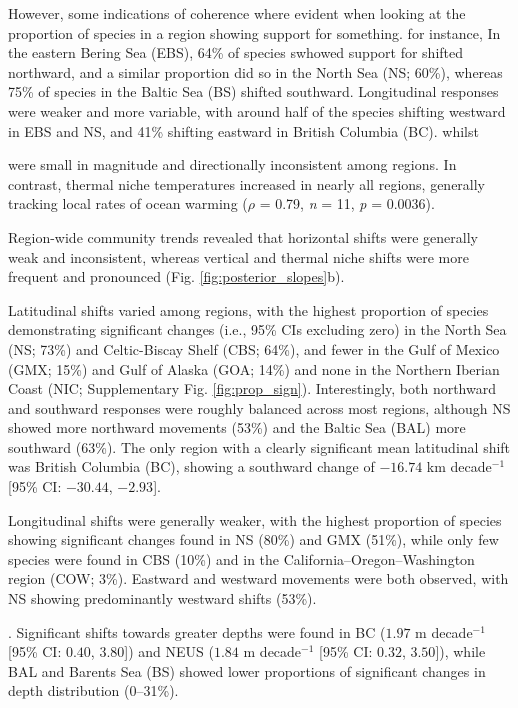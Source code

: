 \documentclass[lineno,pdflatex,sn-nature]{sn-jnl}%
\begin{document}
However, some indications of coherence where evident when looking at the proportion of species in a region showing support for something. for instance, In the eastern Bering Sea (EBS), 64\% of species swhowed support for shifted northward, and a similar proportion did so in the North Sea (NS; 60\%), whereas 75\% of species in the Baltic Sea (BS) shifted southward. Longitudinal responses were weaker and more variable, with around half of the species shifting westward in EBS and NS, and 41\% shifting eastward in British Columbia (BC). whilst 

were small in magnitude and directionally inconsistent among regions. In contrast, thermal niche temperatures increased in nearly all regions, generally tracking local rates of ocean warming (\textit{$\rho$} = 0.79, \textit{n} = 11, \textit{p} = 0.0036).


Region-wide community trends revealed that horizontal shifts were generally weak and inconsistent, whereas vertical and thermal niche shifts were more frequent and pronounced (Fig. \ref{fig:posterior_slopes}b). 

Latitudinal shifts varied among regions, with the highest proportion of species demonstrating significant changes (i.e., 95\% CIs excluding zero) in the North Sea (NS; 73\%) and Celtic-Biscay Shelf (CBS; 64\%), and fewer in the Gulf of Mexico (GMX; 15\%) and Gulf of Alaska (GOA; 14\%) and none in the Northern Iberian Coast (NIC; Supplementary Fig. \ref{fig:prop_sign}). Interestingly, both northward and southward responses were roughly balanced across most regions, although NS showed more northward movements (53\%) and the Baltic Sea (BAL) more southward (63\%). The only region with a clearly significant mean latitudinal shift was British Columbia (BC), showing a southward change of $-16.74$ km decade$^{-1}$ [95\% CI: $-30.44$, $-2.93$].

Longitudinal shifts  were generally weaker, with the highest proportion of species showing significant changes found in NS (80\%) and GMX (51\%), while only few species were found in CBS (10\%) and in the California–Oregon–Washington region (COW; 3\%). Eastward and westward movements were both observed, with NS showing predominantly westward shifts (53\%).

. Significant shifts towards greater depths were found in BC ($1.97$ m decade$^{-1}$ [95\% CI: $0.40$, $3.80$]) and NEUS ($1.84$ m decade$^{-1}$ [95\% CI: $0.32$, $3.50$]), while BAL and Barents Sea (BS) showed lower proportions of significant changes in depth distribution (0–31\%).
\end{document}
